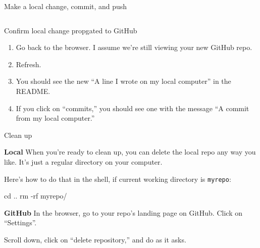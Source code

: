 \documentclass[
  ignorenonframetext,
]{beamer}
\newenvironment{Shaded}{\begin{snugshade}}{\end{snugshade}}
\newcommand{\BuiltInTok}[1]{#1}
\newcommand{\ExtensionTok}[1]{#1}
\newcommand{\FunctionTok}[1]{\textcolor[rgb]{0.00,0.00,0.00}{#1}}
\newcommand{\KeywordTok}[1]{\textcolor[rgb]{0.13,0.29,0.53}{\textbf{#1}}}
\newcommand{\NormalTok}[1]{#1}
\newcommand{\OperatorTok}[1]{\textcolor[rgb]{0.81,0.36,0.00}{\textbf{#1}}}
\begin{document}
\begin{frame}[fragile]{Make a local change, commit, and push}
\begin{columns}[T]
\begin{column}{0.48\textwidth}
\begin{Shaded}
\end{Shaded}
\end{column}
\end{columns}

\end{frame}

\begin{frame}{Confirm local change propgated to GitHub}
\protect\hypertarget{confirm-local-change-propgated-to-github}{}

\begin{enumerate}
\item
  Go back to the browser. I assume we're still viewing your new GitHub
  repo.
\item
  Refresh.
\item
  You should see the new ``A line I wrote on my local computer'' in the
  README.
\item
  If you click on ``commits,'' you should see one with the message ``A
  commit from my local computer.''
\end{enumerate}

\end{frame}

\begin{frame}[fragile]{Clean up}
\protect\hypertarget{clean-up}{}

\textbf{Local} When you're ready to clean up, you can delete the local
repo any way you like. It's just a regular directory on your computer.

Here's how to do that in the shell, if current working directory is
\texttt{myrepo}:

\begin{Shaded}
\begin{Highlighting}[]
\BuiltInTok{cd}\NormalTok{ ..}
\FunctionTok{rm}\NormalTok{ -rf myrepo/}
\end{Highlighting}
\end{Shaded}

\textbf{GitHub} In the browser, go to your repo's landing page on
GitHub. Click on ``Settings''.

Scroll down, click on ``delete repository,'' and do as it asks.

\end{frame}
\end{document}
